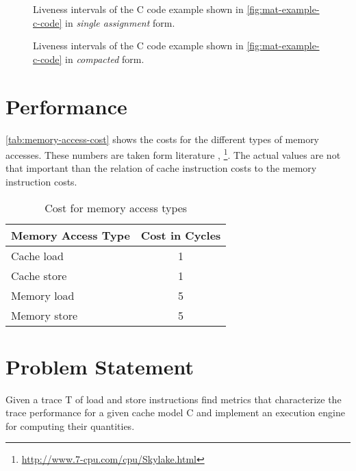 \documentclass[onecolumn, openany, master, english, seal, signatures]{dbrgrptt}
\begin{document}
\begin{figure}[h!]
  \centering
  
  \caption{Liveness intervals of the C code example shown in \autoref{fig:mat-example-c-code} in \emph{single assignment} form.}
  \label{fig:trace-tranformation-sa}
\end{figure}

\begin{figure}[h!]
  \centering
  
  \caption{Liveness intervals of the C code example shown in \autoref{fig:mat-example-c-code} in \emph{compacted} form.}
  \label{fig:trace-tranformation-compact}
\end{figure}

\section{Performance}\label{sec:performance}

\autoref{tab:memory-access-cost} shows the costs for the different types of memory accesses. These numbers are taken form literature \cite{drepper2007every}, \footnote{\url{http://www.7-cpu.com/cpu/Skylake.html}}. The actual values are not that important than the relation of cache instruction costs to the memory instruction costs.
\begin{table}
  \centering
  \begin{tabular}{lc}
  \hline
  Memory Access Type & Cost in Cycles \\
  \hline
  Cache  load  & 1 \\
  Cache  store & 1 \\
  Memory load  & 5 \\
  Memory store & 5 \\
  \hline
  \end{tabular}
  \caption{Cost for memory access types}
  \label{tab:memory-access-cost}
\end{table}

\section{Problem Statement}
Given a trace T of load and store instructions find metrics that characterize the trace performance for a given cache model C and implement an execution engine for computing their quantities.

\end{document}
